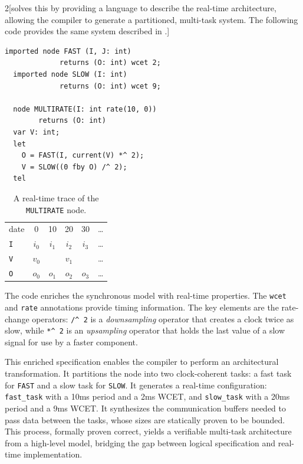 \begin{multicols}{2}[\Prelude solves this by providing a language to describe the real-time
    architecture, allowing the compiler to generate a partitioned, multi-task system. The
    following code provides the same system described in \Prelude.]
  \begin{lstlisting}[basicstyle=\ttfamily\footnotesize\color{BlackText}]
  imported node FAST (I, J: int) 
             returns (O: int) wcet 2;
  imported node SLOW (I: int) 
             returns (O: int) wcet 9;

  node MULTIRATE(I: int rate(10, 0))
        returns (O: int)
  var V: int;
  let
    O = FAST(I, current(V) *^ 2);
    V = SLOW((0 fby O) /^ 2);
  tel
\end{lstlisting}
  \newcolumn
  \begin{table}[H]
    \centering
    \begin{tabular}{l|ccccc}
      date       & 0     & 10    & 20    & 30    & \dots \\
      \texttt{I} & $i_0$ & $i_1$ & $i_2$ & $i_3$ & \dots \\
      \texttt{V} & $v_0$ &       & $v_1$ &       & \dots \\
      \texttt{O} & $o_0$ & $o_1$ & $o_2$ & $o_3$ & \dots \\
    \end{tabular}
    \caption{A real-time trace of the \texttt{MULTIRATE} node.}
    \label{tab:sota:synchronous:prelude:exec}
  \end{table}
\end{multicols}

The \Prelude code enriches the synchronous model with real-time properties. The \texttt{wcet} and
\texttt{rate} annotations provide timing information. The key elements are the rate-change
operators: \verb|/^ 2| is a \emph{downsampling} operator that creates a clock twice as slow, while
\verb|*^ 2| is an \emph{upsampling} operator that holds the last value of a slow signal for use by a
faster component.

This enriched specification enables the \Prelude compiler to perform an architectural
transformation. It partitions the node into two clock-coherent tasks: a fast task for \texttt{FAST}
and a slow task for \texttt{SLOW}. It generates a real-time configuration: \texttt{fast\_task} with
a 10ms period and a 2ms WCET, and \texttt{slow\_task} with a 20ms period and a 9ms WCET. It
synthesizes the communication buffers needed to pass data between the tasks, whose sizes are
statically proven to be bounded. This process, formally proven correct, yields a verifiable
multi-task architecture from a high-level model, bridging the gap between logical specification and
real-time implementation.


